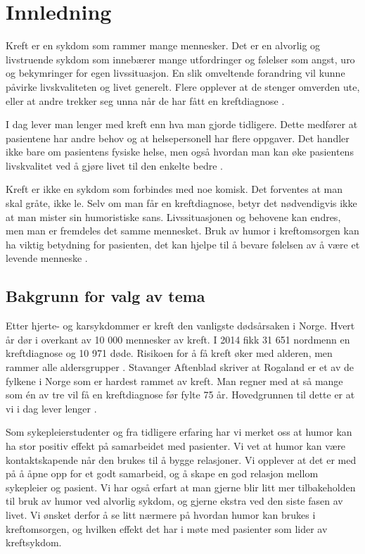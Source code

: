 \chapter{Innledning}

Kreft er en sykdom som rammer mange mennesker. Det er en alvorlig og
livstruende sykdom som innebærer mange utfordringer og følelser som angst, uro
og bekymringer for egen livssituasjon. En slik omveltende forandring vil kunne
påvirke livskvaliteten og livet generelt. Flere opplever at de stenger omverden
ute, eller at andre trekker seg unna når de har fått en kreftdiagnose
\cite{rustoen2008}.

I dag lever man lenger med kreft enn hva man gjorde tidligere. Dette medfører
at pasientene har andre behov og at helsepersonell har flere oppgaver. Det
handler ikke bare om pasientens fysiske helse, men også hvordan man kan øke
pasientens livskvalitet ved å gjøre livet til den enkelte bedre
\cite{rustoen2008}.

Kreft er ikke en sykdom som forbindes med noe komisk. Det forventes at man skal
gråte, ikke le. Selv om man får en kreftdiagnose, betyr det nødvendigvis ikke
at man mister sin humoristiske sans. Livssituasjonen og behovene kan endres,
men man er fremdeles det samme mennesket. Bruk av humor i kreftomsorgen kan ha
viktig betydning for pasienten, det kan hjelpe til å bevare følelsen av å være
et levende menneske \cite{wist2002}.

\section{Bakgrunn for valg av tema}

Etter hjerte- og karsykdommer er kreft den vanligste dødsårsaken i Norge. Hvert
år dør i overkant av 10 000 mennesker av kreft. I 2014 fikk 31 651 nordmenn en
kreftdiagnose og 10 971 døde. Risikoen for å få kreft øker med alderen, men
rammer alle aldersgrupper \cite{grasdal2016}. Stavanger Aftenblad skriver at
Rogaland er et av de fylkene i Norge som er hardest rammet av kreft. Man regner
med at så mange som én av tre vil få en kreftdiagnose før fylte 75 år.
Hovedgrunnen til dette er at vi i dag lever lenger \cite{haugan2015}.

Som sykepleierstudenter og fra tidligere erfaring har vi merket oss at humor
kan ha stor positiv effekt på samarbeidet med pasienter. Vi vet at humor kan
være kontaktskapende når den brukes til å bygge relasjoner. Vi opplever at det
er med på å åpne opp for et godt samarbeid, og å skape en god relasjon mellom
sykepleier og pasient. Vi har også erfart at man gjerne blir litt mer
tilbakeholden til bruk av humor ved alvorlig sykdom, og gjerne ekstra ved den
siste fasen av livet. Vi ønsket derfor å se litt nærmere på hvordan humor kan
brukes i kreftomsorgen, og hvilken effekt det har i møte med pasienter som
lider av kreftsykdom.

